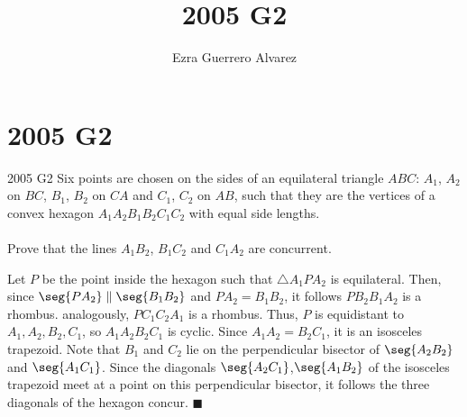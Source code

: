 \documentclass[14pt]{article}
\title{2005 G2}
\author{Ezra Guerrero Alvarez}
\begin{document}
\maketitle
	
\section*{2005 G2}

\begin{statement}{2005 G2}
	Six points are  chosen on the sides of an equilateral triangle $ABC$: $A_1$, $A_2$ on $BC$, $B_1$, $B_2$ on $CA$ and $C_1$, $C_2$ on $AB$, such that they are the vertices of a convex hexagon $A_1A_2B_1B_2C_1C_2$ with equal side lengths. \\\\
	Prove that the lines $A_1B_2$, $B_1C_2$ and $C_1A_2$ are concurrent.
\end{statement}
Let $P$ be the point inside the hexagon such that $\triangle A_1PA_2$ is equilateral. Then, since $\seg{PA_2}\parallel\seg{B_1B_2}$ and $PA_2=B_1B_2$, it follows $PB_2B_1A_2$ is a rhombus. analogously, $PC_1C_2A_1$ is a rhombus. Thus, $P$ is equidistant to $A_1,A_2,B_2,C_1$, so $A_1A_2B_2C_1$ is cyclic. Since $A_1A_2=B_2C_1$, it is an isosceles trapezoid. Note that $B_1$ and $C_2$ lie on the perpendicular bisector of $\seg{A_2B_2}$ and $\seg{A_1C_1}$. Since the diagonals $\seg{A_2C_1}$,$\seg{A_1B_2}$ of the isosceles trapezoid meet at a point on this perpendicular bisector, it follows the three diagonals of the hexagon concur. $\blacksquare$
	
\end{document}
